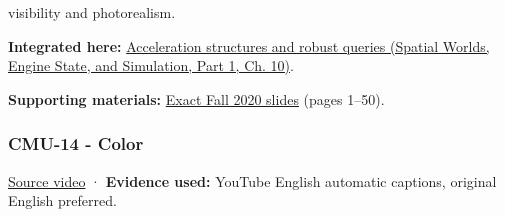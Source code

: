 visibility and photorealism.

\textbf{Integrated here:} \href{../05-Spatial-Worlds-Engine-State-and-Simulation-P01/main.pdf\#nameddest=04-visual-computing-ii-ch029-acceleration-structures-and-robust-queries-1}{Acceleration structures and robust queries (Spatial Worlds, Engine State, and Simulation, Part 1, Ch. 10)}.

\textbf{Supporting materials:} \href{https://15462.courses.cs.cmu.edu/fall2020content/lectures/13_spatialdatastructures/13_spatialdatastructures_slides.pdf}{Exact Fall 2020 slides} (pages 1--50).

\subsubsection{CMU-14 - Color}\label{04-visual-computing-ii-ch036-cmu-14---color}

\hypertarget{04-visual-computing-ii-ch036-cmu-14---color}{}

\href{https://www.youtube.com/watch?v=77WBg0Mprt0}{Source video} · \textbf{Evidence used:} YouTube English automatic captions, original English preferred.

